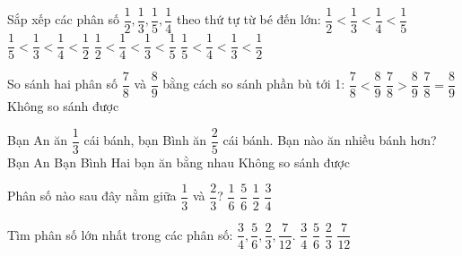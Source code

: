 \begin{ex} %
Sắp xếp các phân số $\dfrac{1}{2}, \dfrac{1}{3}, \dfrac{1}{5}, \dfrac{1}{4}$ theo thứ tự từ bé đến lớn:
\choice
{$\dfrac{1}{2} < \dfrac{1}{3} < \dfrac{1}{4} < \dfrac{1}{5}$}
{$\dfrac{1}{5} < \dfrac{1}{3} < \dfrac{1}{4} < \dfrac{1}{2}$}
{$\dfrac{1}{2} < \dfrac{1}{4} < \dfrac{1}{3} < \dfrac{1}{5}$}
{\True $\dfrac{1}{5} < \dfrac{1}{4} < \dfrac{1}{3} < \dfrac{1}{2}$}
\end{ex}

\begin{ex} %
So sánh hai phân số $\dfrac{7}{8}$ và $\dfrac{8}{9}$ bằng cách so sánh phần bù tới 1:
\choice
{\True $\dfrac{7}{8} < \dfrac{8}{9}$}
{$\dfrac{7}{8} > \dfrac{8}{9}$}
{$\dfrac{7}{8} = \dfrac{8}{9}$}
{Không so sánh được}
\end{ex}

\begin{ex} %
Bạn An ăn $\dfrac{1}{3}$ cái bánh, bạn Bình ăn $\dfrac{2}{5}$ cái bánh. Bạn nào ăn nhiều bánh hơn?
\choice
{Bạn An}
{\True Bạn Bình}
{Hai bạn ăn bằng nhau}
{Không so sánh được}
\end{ex}

\begin{ex} %
Phân số nào sau đây nằm giữa $\dfrac{1}{3}$ và $\dfrac{2}{3}$?
\choice
{$\dfrac{1}{6}$}
{$\dfrac{5}{6}$}
{\True $\dfrac{1}{2}$}
{$\dfrac{3}{4}$}
\end{ex}

\begin{ex} %
Tìm phân số lớn nhất trong các phân số: $\dfrac{3}{4}, \dfrac{5}{6}, \dfrac{2}{3}, \dfrac{7}{12}$.
\choice
{$\dfrac{3}{4}$}
{\True $\dfrac{5}{6}$}
{$\dfrac{2}{3}$}
{$\dfrac{7}{12}$}
\end{ex}

